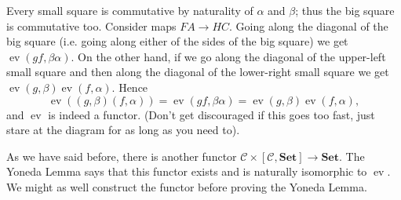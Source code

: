 \documentclass{report}
\newcommand{\mbold}[1]{\mathrm{\mathbf{#1}}}
\DeclareMathOperator{\ev}{ev}
\theoremstyle{definition}
\theoremstyle{plain}
\theoremstyle{definition}
\begin{document}
		Every small square is commutative by naturality of $\alpha$ and $\beta$; thus the big square is commutative too. Consider maps $FA\to HC$. Going along the diagonal of the big square (i.e. going along either of the sides of the big square) we get $\ev(gf,\beta\alpha)$. On the other hand, if we go along the diagonal of the upper-left small square and then along the diagonal of the lower-right small square we get $\ev(g,\beta) \ev(f,\alpha)$. Hence
		\[
			\ev((g,\beta)(f,\alpha)) =\ev(gf,\beta\alpha)= \ev(g,\beta) \ev(f,\alpha),
		\]
		and $\ev$ is indeed a functor. (Don't get discouraged if this goes too fast, just stare at the diagram for as long as you need to).
		
		As we have said before, there is another functor $\mathcal{C}\times[\mathcal{C},\mbold{Set}] \to \mbold{Set}$. The Yoneda Lemma says that this functor exists and is naturally isomorphic to $\ev$. We might as well construct the functor before proving the Yoneda Lemma. 
		
\end{document}
